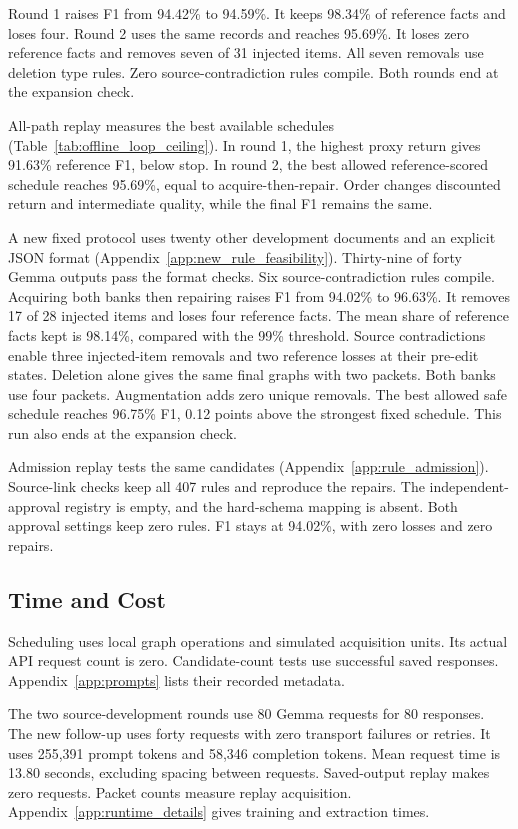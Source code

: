 Round 1 raises F1 from 94.42\% to 94.59\%. It keeps 98.34\% of reference
facts and loses four. Round 2 uses the same records and reaches 95.69\%.
It loses zero reference facts and removes seven of 31 injected items.
All seven removals use deletion type rules. Zero source-contradiction
rules compile. Both rounds end at the expansion check.

All-path replay measures the best available schedules
(Table~\ref{tab:offline_loop_ceiling}). In round 1, the highest proxy
return gives 91.63\% reference F1, below stop. In round 2, the best
allowed reference-scored schedule reaches 95.69\%, equal to
acquire-then-repair. Order changes discounted return and intermediate
quality, while the final F1 remains the same.

A new fixed protocol uses twenty other development documents and an
explicit JSON format (Appendix~\ref{app:new_rule_feasibility}).
Thirty-nine of forty Gemma outputs pass the format checks.
Six source-contradiction rules compile. Acquiring both banks then repairing
raises F1 from 94.02\% to 96.63\%. It removes 17 of 28 injected items
and loses four reference facts. The mean share of reference facts kept is 98.14\%, compared
with the 99\% threshold. Source contradictions enable three injected-item
removals and two reference losses at their pre-edit states.
Deletion alone gives the same final graphs with two packets.
Both banks use four packets. Augmentation adds zero unique removals.
The best allowed safe schedule reaches 96.75\% F1, 0.12 points above
the strongest fixed schedule. This run also ends at the expansion check.

Admission replay tests the same candidates
(Appendix~\ref{app:rule_admission}). Source-link checks keep all 407 rules
and reproduce the repairs. The independent-approval registry is empty,
and the hard-schema mapping is absent. Both approval settings keep
zero rules. F1 stays at 94.02\%, with zero losses and zero repairs.

\subsection{Time and Cost}

\label{subsec:runtime_cost}

Scheduling uses local graph operations and simulated acquisition units.
Its actual API request count is zero. Candidate-count tests use successful
saved responses. Appendix~\ref{app:prompts} lists their recorded metadata.

The two source-development rounds use 80 Gemma requests for 80 responses.
The new follow-up uses forty requests with zero transport failures or
retries. It uses 255,391 prompt tokens and 58,346 completion tokens.
Mean request time is 13.80 seconds, excluding spacing between requests.
Saved-output replay makes zero requests. Packet counts measure replay
acquisition. Appendix~\ref{app:runtime_details} gives training and
extraction times.

